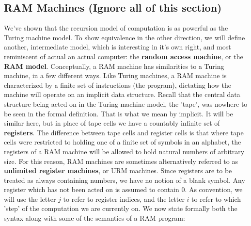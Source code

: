 \documentclass{article}
\theoremstyle{definition}
\theoremstyle{plain}
\theoremstyle{theorem}
\begin{document}
\subsection{RAM Machines (Ignore all of this section)}
We've shown that the recursion model of computation is as powerful as the Turing machine model. To show equivalence in the other direction, we will define another, intermediate model, which is interesting in it's own right, and most reminiscent of actual an actual computer: the \textbf{random access machine}, or the \textbf{RAM model}. Conceptually, a RAM machine has similarities to a Turing machine, in a few different ways. Like Turing machines, a RAM machine is characterized by a finite set of instructions (the program), dictating how the machine will operate on an implicit data structure. Recall that the central data structure being acted on in the Turing machine model, the 'tape', was nowhere to be seen in the formal definition. That is what we mean by implicit. It will be similar here, but in place of tape cells we have a countably infinite set of \textbf{registers}. The difference between tape cells and register cells is that where tape cells were restricted to holding one of a finite set of symbols in an alphabet, the registers of a RAM machine will be allowed to hold natural numbers of arbitrary size. For this reason, RAM machines are sometimes alternatively referred to as \textbf{unlimited register machines}, or URM machines. Since registers are to be treated as always containing numbers, we have no notion of a blank symbol. Any register which has not been acted on is assumed to contain $0$. As convention, we will use the letter $j$ to refer to register indices, and the letter $i$ to refer to which 'step' of the computation we are currently on. We now state formally both the syntax along with some of the semantics of a RAM program:
\end{document}
